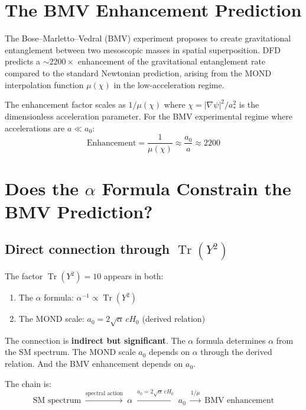 \documentclass[12pt,a4paper]{article}
\newcommand{\Tr}{\operatorname{Tr}}
\begin{document}
\section{The BMV Enhancement Prediction}

The Bose--Marletto--Vedral (BMV) experiment proposes to create gravitational entanglement between two mesoscopic masses in spatial superposition. DFD predicts a $\sim 2200\times$ enhancement of the gravitational entanglement rate compared to the standard Newtonian prediction, arising from the MOND interpolation function $\mu(\chi)$ in the low-acceleration regime.

The enhancement factor scales as $1/\mu(\chi)$ where $\chi = |\nabla\psi|^2/a_*^2$ is the dimensionless acceleration parameter. For the BMV experimental regime where accelerations are $a \ll a_0$:
\begin{equation}
\text{Enhancement} = \frac{1}{\mu(\chi)} \approx \frac{a_0}{a} \approx 2200
\end{equation}

\section{Does the $\alpha$ Formula Constrain the BMV Prediction?}

\subsection{Direct connection through $\Tr(Y^2)$}

The factor $\Tr(Y^2) = 10$ appears in both:
\begin{enumerate}
\item The $\alpha$ formula: $\alpha^{-1} \propto \Tr(Y^2)$
\item The MOND scale: $a_0 = 2\sqrt{\alpha}\,cH_0$ (derived relation)
\end{enumerate}

The connection is \textbf{indirect but significant}. The $\alpha$ formula determines $\alpha$ from the SM spectrum. The MOND scale $a_0$ depends on $\alpha$ through the derived relation. And the BMV enhancement depends on $a_0$.

The chain is:
\begin{equation}
\text{SM spectrum} \;\xrightarrow{\text{spectral action}}\; \alpha \;\xrightarrow{a_0 = 2\sqrt{\alpha}\,cH_0}\; a_0 \;\xrightarrow{1/\mu}\; \text{BMV enhancement}
\end{equation}
\end{document}
